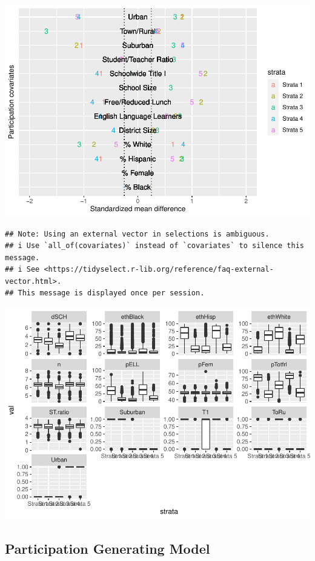 \documentclass[
  english,
  man,floatsintext]{apa6}
\begin{document}
\includegraphics{5---Analysis_files/figure-latex/unnamed-chunk-8-1.pdf}

\begin{verbatim}
## Note: Using an external vector in selections is ambiguous.
## i Use `all_of(covariates)` instead of `covariates` to silence this message.
## i See <https://tidyselect.r-lib.org/reference/faq-external-vector.html>.
## This message is displayed once per session.
\end{verbatim}

\includegraphics{5---Analysis_files/figure-latex/unnamed-chunk-9-1.pdf}

\hypertarget{participation-generating-model}{%
\subsection{Participation Generating Model}\label{participation-generating-model}}
\end{document}
